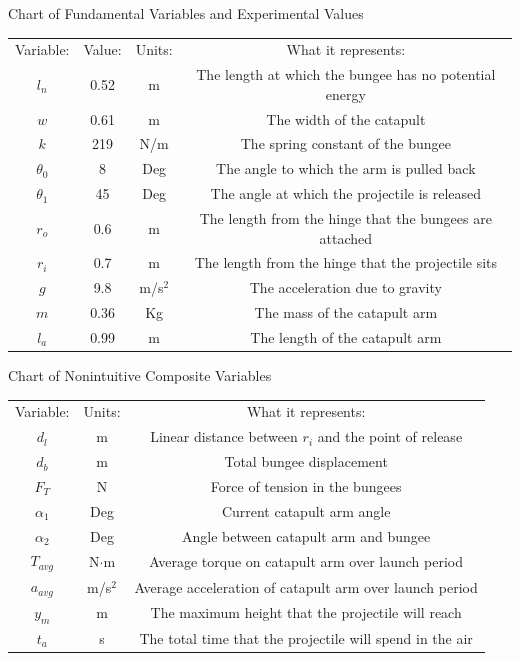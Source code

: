 \documentclass[10pt]{article}
\begin{document}
\begin{flushleft}
    \begin{center}
      Chart of Fundamental Variables and Experimental Values
      \begin{tabular}{ |c|c|c|c| } 
        \hline
        Variable: & Value: & Units: & What it represents: \\ 
        $l_n$& 0.52 & m & The length at which the bungee has no potential energy \\ 
        $w$& 0.61 & m & The width of the catapult \\ 
        $k$& 219 & N/m & The spring constant of the bungee \\ 
        $\theta_0$& 8 & Deg & The angle to which the arm is pulled back \\ 
        $\theta_1$& 45 & Deg & The angle at which the projectile is released \\ 
        $r_o$& 0.6 & m & The length from the hinge that the bungees are attached \\ 
        $r_i$& 0.7 & m & The length from the hinge that the projectile sits \\ 
        $g$& 9.8 & m/s$^2$ & The acceleration due to gravity \\
        $m$& 0.36 & Kg & The mass of the catapult arm\\ 
        $l_a$& 0.99 & m & The length of the catapult arm\\ 
        \hline
      \end{tabular}
    \end{center}
    
    \begin{center}
      Chart of Nonintuitive Composite Variables \\
      \begin{tabular}{ |c|c|c| } 
        \hline
        Variable: & Units: & What it represents: \\ 
        $d_l$ & m & Linear distance between $r_i$ and the point of release \\
        $d_b$ & m & Total bungee displacement \\
        $F_T$ & N & Force of tension in the bungees \\
        $\alpha_1$ & Deg & Current catapult arm angle \\
        $\alpha_2$ & Deg & Angle between catapult arm and bungee\\
        $T_{avg}$ & N$\cdot$m & Average torque on catapult arm over launch period\\
        $a_{avg}$ & m/s$^2$ & Average acceleration of catapult arm over launch period\\
        $y_m$ & m & The maximum height that the projectile will reach\\
        $t_a$ & s & The total time that the projectile will spend in the air\\
        \hline
      \end{tabular}
    \end{center}


\end{flushleft}
\end{document}
